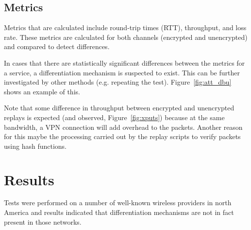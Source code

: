 \documentclass[letterpaper]{sig-alternate-10pt}
\begin{document}

\subsection{Metrics}

Metrics that are calculated include round-trip times (RTT), throughput, and loss rate. These metrics are calculated for both channels (encrypted and unencrypted) and compared to detect differences.

In cases that there are statistically significant differences between the metrics for a service, a differentiation mechanism is suspected to exist. This can be further investigated by other methods (e.g. repeating the test). Figure~\ref{fig:att_dbu} shows an example of this.


Note that some difference in throughput between encrypted and unencrypted replays is expected (and observed, Figure~\ref{fig:xputs}) because at the same bandwidth, a VPN connection will add overhead to the packets. Another reason for this maybe the processing carried out by the replay scripts to verify packets using hash functions.


\section{Results}

Tests were performed on a number of well-known wireless providers in north America and results indicated that differentiation mechanisms are not in fact present in those networks.
\end{document}
